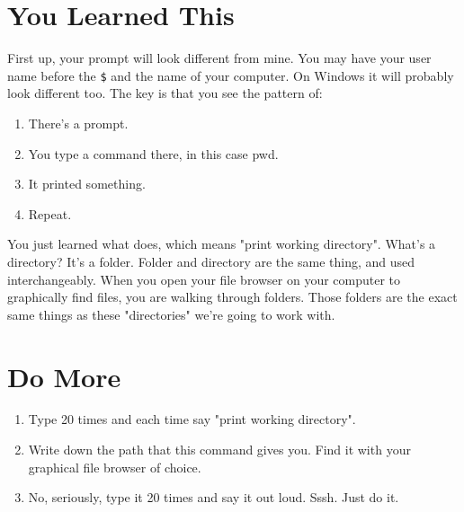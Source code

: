 \section{You Learned This}

First up, your prompt will look different from mine.  You may have your user
name before the \verb|$| and the name of your computer.  On Windows it will
probably look different too.  The key is that you see the pattern of:

\begin{enumerate}
\item There's a prompt.
\item You type a command there, in this case pwd.
\item It printed something.
\item Repeat.
\end{enumerate}

You just learned what  does, which means "print working
directory".  What's a directory?  It's a folder.  Folder and directory are the
same thing, and used interchangeably.  When you open your file browser on your
computer to graphically find files, you are walking through folders.  Those
folders are the exact same things as these "directories" we're going to work
with.

\section{Do More}

\begin{enumerate}
\item Type  20 times and each time say "print working directory".
\item Write down the path that this command gives you.  Find it with your 
    graphical file browser of choice.
\item No, seriously, type it 20 times and say it out loud.  Sssh.  Just do it.
\end{enumerate}

